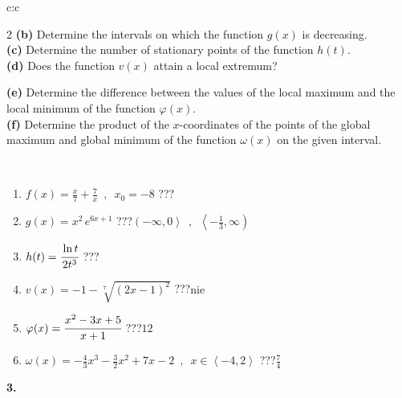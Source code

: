 \documentclass[10pt]{report}
\begin{document}
\begin{tabular}{c:c}
\begin{minipage}[c][104.5mm][t]{0.5\linewidth}
\begin{center}
\begin{minipage}{0.95\linewidth}
\begin{center}
{\begin{multicols}{2}
\textbf{(b)} Determine the intervals on which the function \(g(x)\) is decreasing. \\[1mm]
\textbf{(c)} Determine the number of stationary points of the function \(h(t)\). \\[1mm]
\textbf{(d)} Does the function \(v(x)\) attain a local extremum? \par \columnbreak
\textbf{(e)} Determine the difference between the values of the local maximum and the local minimum of the function \(\varphi(x)\). \\[1mm]
\textbf{(f)} Determine the product of the \(x\)-coordinates of the points of the global maximum and global minimum of the function \(\omega(x)\) on the given interval. \\[1mm]
\end{multicols}
}
\end{center}
\end{minipage}
\\[1mm]
\begin{minipage}{0.79\linewidth}
\begin{center}
\begin{varwidth}{\linewidth}
\setlength{\itemsep}{0pt}
\begin{enumerate}
\normalsize
\item $f(x)=\frac{x}{7}+\frac{7}{x} \enspace , \enspace x_0=-8$\quad \dotfill\; ???\;\dotfill \quad {}
\item $g(x)=x^2\, e^{6x+1}$\quad \dotfill\; ???\;\dotfill \quad $\left(-\infty , 0\right\rangle\enspace , \enspace \left\langle-\frac{1}{3} , \infty\right)$
\item $h(t)=\cfrac{\ln t}{2t^3}$\quad \dotfill\; ???\;\dotfill {}
\item $v(x)=-1-\sqrt[7]{(2x-1)^2}$\quad \dotfill\; ???\;\dotfill \quad $\text{nie}$
\item $\varphi(x)=\cfrac{x^2-3x+5}{x+1}$\quad \dotfill\; ???\;\dotfill \quad $12$
\item $\omega(x)=-\frac{4}{3}x^3-\frac{3}{2}x^2+7x-2 \enspace , \enspace x\in\left\langle-4 , 2\right\rangle$\quad \dotfill\; ???\;\dotfill \quad $\frac{7}{4}$
\end{enumerate}
\end{varwidth}
\end{center}
\end{minipage}
\begin{minipage}{0.20\linewidth}
\begin{center}
{\Huge\bfseries 3.} \\[2mm]

\end{center}
\end{minipage}
\end{center}
\end{minipage}
\end{tabular}
\end{document}
